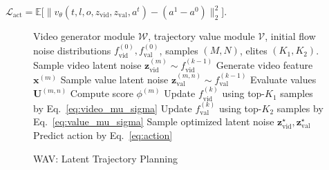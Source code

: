 $\mathcal{L}_{\mathrm{act}} = \mathbb{E}\big[\| v_\theta(t, l, o, z_{\mathrm{vid}}, z_{\mathrm{val}}, a^t) - (a^1 - a^0) \|_2^2 \big]$.

\begin{figure}
\vspace{-10pt}
\begin{minipage}{0.56\columnwidth}
\begin{algorithm}[H]
\caption{WAV: Latent Trajectory Planning}
\label{alg:latent_mppi}
\begin{algorithmic}[1]
\State Video generator module $\mathcal{W}$, trajectory value module $\mathcal{V}$, initial flow noise distributions $f_{\mathrm{vid}}^{(0)}, f_{\mathrm{val}}^{(0)}$, samples $(M,N)$, elites $(K_1,K_2)$.
    \State Sample video latent noise $\mathbf{z}_{\mathrm{vid}}^{(m)} \sim f_{\mathrm{vid}}^{(k-1)}$
    \State Generate video feature $\mathbf{x}^{(m)}$ 
        \State Sample value latent noise $\mathbf{z}_{\mathrm{val}}^{(m,n)} \sim f_{\mathrm{val}}^{(k-1)}$
        \State Evaluate values $\mathbf{U}^{(m,n)}$ 
        \State Compute score $\phi^{(m)}$ 
    \EndFor
    \State Update $f_{\mathrm{vid}}^{(k)}$ using top-$K_1$ samples by Eq.~\ref{eq:video_mu_sigma}
    \State Update $f_{\mathrm{val}}^{(k)}$ using top-$K_2$ samples by Eq.~\ref{eq:value_mu_sigma}
\EndFor
\State Sample optimized latent noise $\mathbf{z}_{\mathrm{vid}}^\star, \mathbf{z}_{\mathrm{val}}^\star$
\State Predict action by Eq.~\ref{eq:action}
\end{algorithmic}
\end{algorithm}
\end{minipage}
\vspace{-10pt}
\end{figure}

